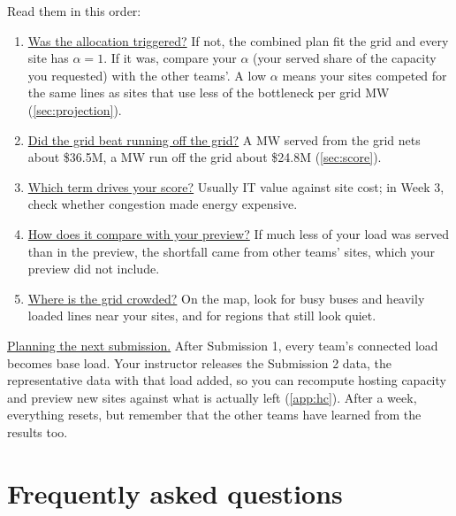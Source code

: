 \documentclass[10pt]{article}
\newcommand{\alert}[1]{{\color{alertblue}\uline{#1}}}
\begin{document}
Read them in this order:
\begin{enumerate}[leftmargin=*]
  \item \alert{Was the allocation triggered?} If not, the combined plan fit
    the grid and every site has $\alpha = 1$. If it was, compare your
    $\alpha$ (your served share of the capacity you requested) with the other
    teams'. A low $\alpha$ means your sites competed for the same lines as
    sites that use less of the bottleneck per grid MW (\cref{sec:projection}).
  \item \alert{Did the grid beat running off the grid?} A MW served from the
    grid nets about \$36.5M, a MW run off the grid about \$24.8M
    (\cref{sec:score}).
  \item \alert{Which term drives your score?} Usually IT value against site
    cost; in Week 3, check whether congestion made energy expensive.
  \item \alert{How does it compare with your preview?} If much less of your
    load was served than in the preview, the shortfall came from other teams'
    sites, which your preview did not include.
  \item \alert{Where is the grid crowded?} On the map, look for busy buses and
    heavily loaded lines near your sites, and for regions that still look
    quiet.
\end{enumerate}

\alert{Planning the next submission.} After Submission 1, every team's
connected load becomes base load. Your instructor releases the Submission 2
data, the representative data with that load added, so you can recompute
hosting capacity and preview new sites against what is actually left
(\cref{app:hc}). After a week, everything resets, but remember that the other
teams have learned from the results too.

\section{Frequently asked questions}\label{sec:faq}
\end{document}

